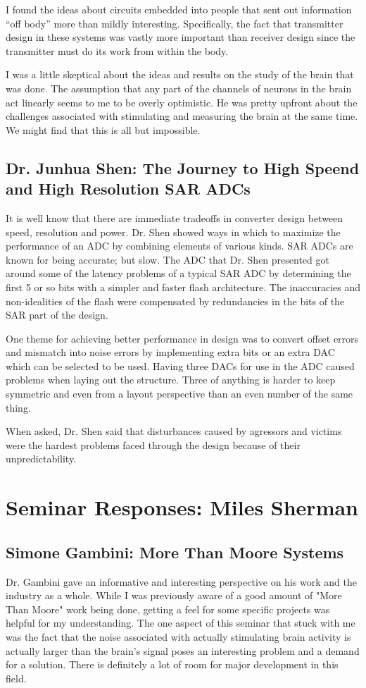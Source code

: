 \documentclass[journal]{IEEEtran}
\begin{document}
I found the ideas about circuits embedded into people that sent out information ``off body'' more than mildly interesting. Specifically, the fact that transmitter design in these systems was vastly more important than receiver design since the transmitter must do its work from within the body.

I was a little skeptical about the ideas and results on the study of the brain that was done. The assumption that any part of the channels of neurons in the brain act linearly seems to me to be overly optimistic. He was pretty upfront about the challenges associated with stimulating and measuring the brain at the same time. We might find that this is all but impossible.


\subsection{Dr. Junhua Shen: The Journey to High Speend and High Resolution SAR ADCs}
It is well know that there are immediate tradeoffs in converter design between speed, resolution and power. Dr. Shen showed ways in which to maximize the performance of an ADC by combining elements of various kinds. SAR ADCs are known for being accurate; but slow. The ADC that Dr. Shen presented got around some of the latency problems of a typical SAR ADC by determining the first 5 or so bits with a simpler and faster flash architecture. The inaccuracies and non-idealities of the flash were compensated by redundancies in the bits of the SAR part of the design. 

One theme for achieving better performance in design was to convert offset errors and mismatch into noise errors by implementing extra bits or an extra DAC which can be selected to be used. Having three DACs for use in the ADC caused problems when laying out the structure. Three of anything is harder to keep symmetric and even from a layout perspective than an even number of the same thing.

When asked, Dr. Shen said that disturbances caused by agressors and victims were the hardest problems faced through the design because of their unpredictability.

\section{Seminar Responses: Miles Sherman}
\subsection{Simone Gambini: More Than Moore Systems}
Dr. Gambini gave an informative and interesting perspective on his work and the industry as a whole. While I was previously aware of a good amount of "More Than Moore" work being done, getting a feel for some specific projects was helpful for my understanding. The one aspect of this seminar that stuck with me was the fact that the noise associated with actually stimulating brain activity is actually larger than the brain's signal poses an interesting problem and a demand for a solution. There is definitely a lot of room for major development in this field.
\end{document}
